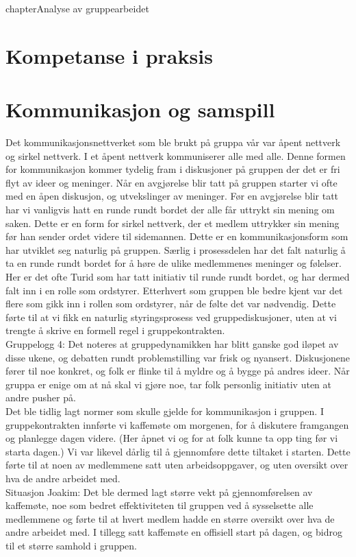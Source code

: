 
chapter{Analyse av gruppearbeidet}
\section{Kompetanse i praksis}

\section{Kommunikasjon og samspill}
Det kommunikasjonsnettverket som ble brukt på gruppa vår var åpent nettverk og sirkel nettverk. I et åpent nettverk kommuniserer alle med alle. Denne formen for kommunikasjon kommer tydelig fram i diskusjoner på gruppen der det er fri flyt av ideer og meninger. Når en avgjørelse blir tatt på gruppen starter vi ofte med en åpen diskusjon, og utvekslinger av meninger. Før en avgjørelse blir tatt har vi vanligvis hatt en runde rundt bordet der alle får uttrykt sin mening om saken. Dette er en form for sirkel nettverk, der et medlem uttrykker sin mening før han sender ordet videre til sidemannen. Dette er en kommunikasjonsform som har utviklet seg naturlig på gruppen. Særlig i prosessdelen har det falt naturlig å ta en runde rundt bordet for å høre de ulike medlemmenes meninger og følelser. Her er det ofte Turid som har tatt initiativ til runde rundt bordet, og har dermed falt inn i en rolle som ordstyrer. Etterhvert som gruppen ble bedre kjent var det flere som gikk inn i rollen som ordstyrer, når de følte det var nødvendig. Dette førte til at vi fikk en naturlig styringsprosess ved gruppediskusjoner, uten at vi trengte å skrive en formell regel i gruppekontrakten.\\

Gruppelogg 4:
Det noteres at gruppedynamikken har blitt ganske god iløpet av disse ukene, og
debatten rundt problemstilling var frisk og nyansert. Diskusjonene fører til noe
konkret, og folk er flinke til å myldre og å bygge på andres ideer. Når gruppa
er enige om at nå skal vi gjøre noe, tar folk personlig initiativ uten at andre
pusher på.\\
Det ble tidlig lagt normer som skulle gjelde for kommunikasjon i gruppen. I gruppekontrakten innførte vi kaffemøte om morgenen, for å diskutere framgangen og planlegge dagen videre. (Her åpnet vi og for at folk kunne ta opp ting før vi starta dagen.) Vi var likevel dårlig til å gjennomføre dette tiltaket i starten. Dette førte til at noen av medlemmene satt uten arbeidsoppgaver, og uten oversikt over hva de andre arbeidet med. \\
Situasjon Joakim:
Det ble dermed lagt større vekt på gjennomførelsen av kaffemøte, noe som bedret effektiviteten til gruppen ved å sysselsette alle medlemmene og førte til at hvert medlem hadde en større oversikt over hva de andre arbeidet med. I tillegg satt kaffemøte en offisiell start på dagen, og bidrog til et større samhold i gruppen. \\\

